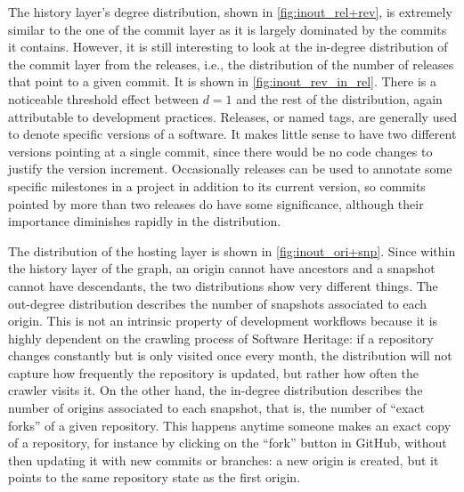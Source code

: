 The history layer's degree distribution, shown in \cref{fig:inout_rel+rev},
is extremely similar to the one of the commit layer as it is largely dominated
by the commits it contains. However, it is still interesting
to look at the in-degree distribution of the commit layer from the releases,
i.e., the distribution of the number of releases that point to a given commit.
It is shown in \cref{fig:inout_rev_in_rel}.  There is a noticeable threshold
effect between $d = 1$ and the rest of the distribution, again attributable to
development practices. Releases, or named tags, are generally used to denote
specific versions of a software. It makes little sense to have two different
versions pointing at a single commit, since there would be no code changes to
justify the version increment. Occasionally releases can be used to annotate
some specific milestones in a project in addition to its current version, so
commits pointed by more than two releases do have some significance, although
their importance diminishes rapidly in the distribution.


The distribution of the hosting layer is shown in \cref{fig:inout_ori+snp}.
Since within the history layer of the graph, an origin cannot have ancestors
and a snapshot cannot have descendants, the two distributions show very
different things.
The out-degree distribution describes the number of snapshots associated to
each origin. This is not an intrinsic property of development workflows
because it is highly dependent on the crawling process of Software Heritage: if
a repository changes constantly but is only visited once every month, the
distribution will not capture how frequently the repository is updated, but
rather how often the crawler visits it.
On the other hand, the in-degree distribution describes the number of origins
associated to each snapshot, that is, the number of ``exact forks'' of a given
repository. This happens anytime someone makes an exact copy of a repository,
for instance by clicking on the ``fork'' button in GitHub, without then
updating it with new commits or branches: a new origin is created, but it
points to the same repository state as the first origin.


% 

